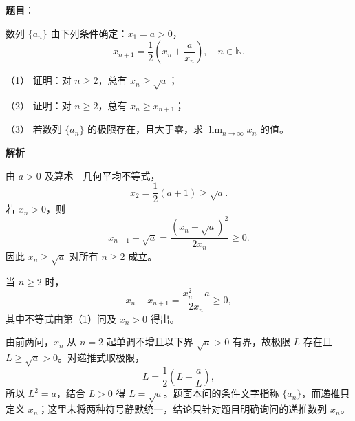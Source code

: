 \begin{answer}

\textbf{题目}：

数列 \(\{a_n\}\) 由下列条件确定：\(x_1=a>0\)，
\nopagebreak[4]
\[
x_{n+1}=\frac12\left(x_n+\frac{a}{x_n}\right),\quad n\in\mathbb N.
\]

（1） 证明：对 \(n\geqslant2\)，总有 \(x_n\geqslant\sqrt a\)；

（2） 证明：对 \(n\geqslant2\)，总有 \(x_n\geqslant x_{n+1}\)；

（3） 若数列 \(\{a_n\}\) 的极限存在，且大于零，求 \(\lim_{n\to\infty}x_n\) 的值。

\textbf{解析}


由 \(a>0\) 及算术—几何平均不等式，
\nopagebreak[4]
\[
x_2=\frac12\left(a+1\right)\geqslant\sqrt a.
\]
若 \(x_n>0\)，则
\nopagebreak[4]
\[
x_{n+1}-\sqrt a=\frac{(x_n-\sqrt a)^2}{2x_n}\geqslant0.
\]
因此 \(x_n\geqslant\sqrt a\) 对所有 \(n\geqslant2\) 成立。


当 \(n\geqslant2\) 时，
\nopagebreak[4]
\[
x_n-x_{n+1}=\frac{x_n^2-a}{2x_n}\geqslant0,
\]
其中不等式由第（1）问及 \(x_n>0\) 得出。


由前两问，\(x_n\) 从 \(n=2\) 起单调不增且以下界 \(\sqrt a>0\) 有界，故极限 \(L\) 存在且 \(L\geqslant\sqrt a>0\)。对递推式取极限，
\nopagebreak[4]
\[
L=\frac12\left(L+\frac aL\right),
\]
所以 \(L^2=a\)，结合 \(L>0\) 得 \(L=\sqrt a\)。题面本问的条件文字指称 \(\{a_n\}\)，而递推只定义 \(x_n\)；这里未将两种符号静默统一，结论只针对题目明确询问的递推数列 \(x_n\)。




\end{answer}
